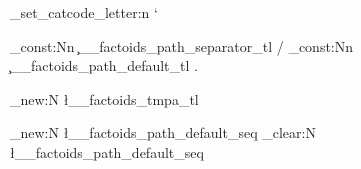 \usepackage{expl3}
\usepackage{xparse}

\everymath{\displaystyle}

\usepackage[T1]{fontenc}
\usepackage{amsthm, amsmath, amssymb}
\usepackage[fixamsmath]{mathtools}  %
\usepackage[cal=cm, scr=rsfs, frak=euler, bb=ams]{mathalpha}
\usepackage{lmodern}

\usepackage{cancel}
\usepackage[nointegrals]{wasysym}

\usepackage{mleftright}
\mleftright
\usepackage{physics}  %
\usepackage{quiver}  %
\usetikzlibrary{angles}
\usetikzlibrary{positioning} %
\usepackage{microtype}  %
\usepackage{polynom}

\usepackage{hwemoji}  %

\def\mbb#1{\mathbb{#1}}
\def\mfk#1{\mathfrak{#1}}

\def\N{\mbb{N}}
\def\C{\mbb{C}}
\def\R{\mbb{R}}
\def\pr{\mbb{P}}
\def\Q{\mbb{Q}}
\def\Z{\mbb{Z}}

\def\la{\leftarrow}
\def\La{\Leftarrow}
\def\ra{\rightarrow}
\def\Ra{\Rightarrow}
\def\lp{\left(}
\def\rp{\right)}
\def\lk{\left[}
\def\rk{\right]}
\def\lb{\left\{}
\def\rb{\right\}}

\def\del{\nabla}
\def\eps{\varepsilon}
\def\inv{{-1}}
\def\pa{\partial}
\def\vp{\varphi}
\def\y{\infty}
\def\th{\theta}

\newcommand{\pdif}[3]{\frac{\partial^{#3}#1}{\partial#2^{#3}}}
\DeclarePairedDelimiter\floor{\lfloor}{\rfloor}
\DeclarePairedDelimiter\ceil{\lceil}{\rceil}

\ExplSyntaxOn
\char_set_catcode_letter:n { `\@ }


\tl_const:Nn \c__factoids_path_separator_tl { / }
\tl_const:Nn \c__factoids_path_default_tl   { . }

\tl_new:N \l__factoids_tmpa_tl

\seq_new:N   \l__factoids_path_default_seq
\seq_clear:N \l__factoids_path_default_seq

